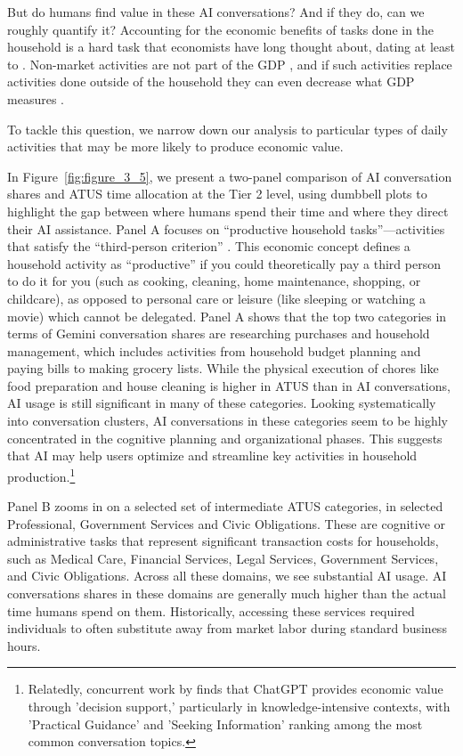 \documentclass[11pt,a4paper]{article}
\begin{document}
But do humans find value in these AI conversations? And if they do, can we roughly quantify it? Accounting for the economic benefits of tasks done in the household is a hard task that economists have long thought about, dating at least to \citet{kuznets1934national}. Non-market activities are not part of the GDP \citep{d30fe982-b2ca-36d9-afa7-fe11e723435a, https://doi.org/10.17863/cam.84770, Ramey_2009}, and if such activities replace activities done outside of the household they can even decrease what GDP measures \citep{becker1965}.

To tackle this question, we narrow down our analysis to particular types of daily activities that may be more likely to produce economic value.

In Figure~\ref{fig:figure_3_5}, we present a two-panel comparison of AI conversation shares and ATUS time allocation at the Tier 2 level, using dumbbell plots to highlight the gap between where humans spend their time and where they direct their AI assistance. Panel A focuses on ``productive household tasks''---activities that satisfy the ``third-person criterion'' \citep{reid1934economics}. This economic concept defines a household activity as ``productive'' if you could theoretically pay a third person to do it for you (such as cooking, cleaning, home maintenance, shopping, or childcare), as opposed to personal care or leisure (like sleeping or watching a movie) which cannot be delegated. Panel A shows that the top two categories in terms of Gemini conversation shares are researching purchases and household management, which includes activities from household budget planning and paying bills to making grocery lists. While the physical execution of chores like food preparation and house cleaning is higher in ATUS than in AI conversations, AI usage is still significant in many of these categories. Looking systematically into conversation clusters, AI conversations in these categories seem to be highly concentrated in the cognitive planning and organizational phases. This suggests that AI may help users optimize and streamline key activities in household production.\footnote{Relatedly, concurrent work by \cite{NBERw34255} finds that ChatGPT provides economic value through 'decision support,' particularly in knowledge-intensive contexts, with 'Practical Guidance' and 'Seeking Information' ranking among the most common conversation topics.}

Panel B zooms in on a selected set of intermediate ATUS categories, in selected Professional, Government Services and Civic Obligations. These are cognitive or administrative tasks that represent significant transaction costs for households, such as Medical Care, Financial Services, Legal Services, Government Services, and Civic Obligations. Across all these domains, we see substantial AI usage. AI conversations shares in these domains are generally much higher than the actual time humans spend on them. Historically, accessing these services required individuals to often substitute away from market labor during standard business hours.
\end{document}
